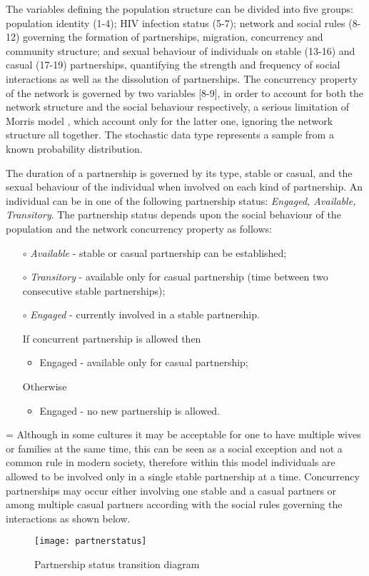 The variables defining the population structure can be divided into five groups:
population identity (1-4); HIV infection status (5-7); network and social rules (8-12)
governing the formation of partnerships, migration, concurrency and community structure;
and sexual behaviour of individuals on stable (13-16) and casual (17-19) partnerships,
quantifying the strength and frequency of social interactions as well as the dissolution
of partnerships. The concurrency property of the network is governed by two variables
[8-9], in order to account for both the network structure and the social behaviour
respectively, a serious limitation of Morris model \cite{morrism1997}, which account only
for the latter one, ignoring the network structure all together. The stochastic data type
represents a sample from a known probability distribution.

The duration of a partnership is governed by its type, stable or casual, and the sexual
behaviour of the individual when involved on each kind of partnership. An individual can
be in one of the following partnership status: \emph{Engaged, Available, Transitory}. The
partnership status depends upon the social behaviour of the population and the network
concurrency property as follows:
\parskip=0pt
\begin{itemize}
    \item [$\circ$] \emph{Available} - stable or casual partnership can be established;
    \item [$\circ$] \emph{Transitory} - available only for casual partnership (time between two consecutive stable
partnerships);
    \item [$\circ$] \emph{Engaged} - currently involved in a stable partnership.
    \item [] If concurrent partnership is allowed then
    \begin{itemize}
        \item Engaged - available only for casual partnership;
    \end{itemize}
    \item [] Otherwise
    \begin{itemize}
        \item Engaged - no new partnership is allowed.
    \end{itemize}
\end{itemize}
\parskip=\baselineskip
Although in some cultures it may be acceptable for one to have multiple wives or families
at the same time, this can be seen as a social exception and not a common rule in modern
society, therefore within this model individuals are allowed to be involved only in a
single stable partnership at a time. Concurrency partnerships may occur either involving
one stable and a casual partners or among multiple casual partners according with the
social rules governing the interactions as shown below.
\begin{figure}[h]
\begin{center}
\texttt{[image: partnerstatus]}
\caption{Partnership status transition diagram} \label{partnerstatus}
\end{center}
\end{figure}

